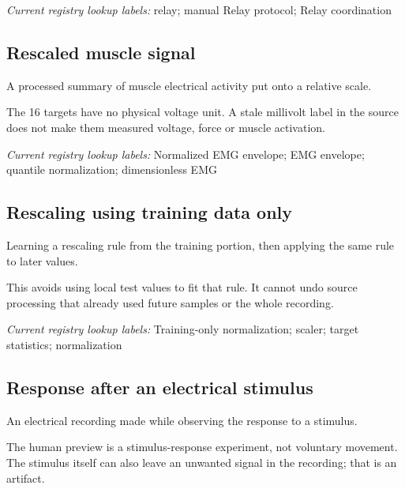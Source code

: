 \noindent\textit{Current registry lookup labels:} relay; manual Relay protocol; Relay coordination\par

\begin{samepage}
\subsection*{Rescaled muscle signal}
\noindent A processed summary of muscle electrical activity put onto a relative scale.\par
\end{samepage}
\begin{samepage}
\noindent The 16 targets have no physical voltage unit. A stale millivolt label in the source does not make them measured voltage, force or muscle activation.\par\nopagebreak[4]

\end{samepage}


\noindent\textit{Current registry lookup labels:} Normalized EMG envelope; EMG envelope; quantile normalization; dimensionless EMG\par

\begin{samepage}
\subsection*{Rescaling using training data only}
\noindent Learning a rescaling rule from the training portion, then applying the same rule to later values.\par
\end{samepage}
\begin{samepage}
\noindent This avoids using local test values to fit that rule. It cannot undo source processing that already used future samples or the whole recording.\par\nopagebreak[4]

\end{samepage}


\noindent\textit{Current registry lookup labels:} Training-only normalization; scaler; target statistics; normalization\par

\begin{samepage}
\subsection*{Response after an electrical stimulus}
\noindent An electrical recording made while observing the response to a stimulus.\par
\end{samepage}
\begin{samepage}
\noindent The human preview is a stimulus-response experiment, not voluntary movement. The stimulus itself can also leave an unwanted signal in the recording; that is an artifact.\par\nopagebreak[4]

\end{samepage}


